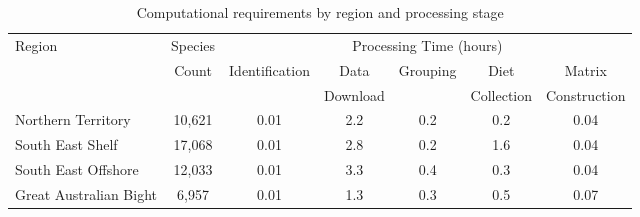 \begin{table}[htbp]
    \centering
    \footnotesize
    \caption{Computational requirements by region and processing stage}
    \label{tab:timing_analysis}
    \begin{tabular}{lcccccc}
    \hline
    Region & Species & \multicolumn{5}{c}{Processing Time (hours)} \\
    \cline{3-7}
     & Count & Identification & Data & Grouping & Diet & Matrix \\
     & & & Download & & Collection & Construction \\
    \hline
    Northern Territory & 10,621 & 0.01 & 2.2 & 0.2 & 0.2 & 0.04 \\
    South East Shelf & 17,068 & 0.01 & 2.8 & 0.2 & 1.6 & 0.04 \\
    South East Offshore & 12,033 & 0.01 & 3.3 & 0.4 & 0.3 & 0.04 \\
    Great Australian Bight & 6,957 & 0.01 & 1.3 & 0.3 & 0.5 & 0.07 \\
    \hline
    \end{tabular}
    \vspace{1ex}
    \end{table}
    
